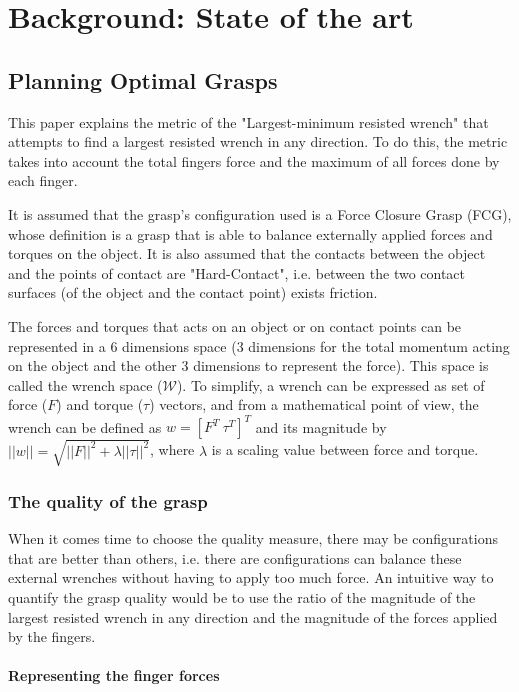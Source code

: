 
\chapter{Background: State of the art}
\label{chapter:evaluation}
\section{Planning Optimal Grasps}
\label{section:LMRW}

This paper \cite{ferrari1992planning} explains the metric of the "Largest-minimum resisted wrench" that attempts to find a largest resisted wrench in any direction. To do this, the metric takes into account the total fingers force and the maximum of all forces done by each finger.
\par
It is assumed that the grasp's configuration used is a Force Closure Grasp (FCG), whose definition is a grasp that is able to balance externally applied forces and torques on the object.
It is also assumed that the contacts between the object and the points of contact are "Hard-Contact", i.e. between the two contact surfaces (of the object and the contact point) exists friction.
\par
The forces and torques that acts on an object or on contact points can be represented in a 6 dimensions space (3 dimensions for the total momentum acting on the object and the other 3 dimensions to represent the force). This space is called the wrench space ($\mathcal{W}$). To simplify, a wrench can be expressed as set of force ($F$) and torque ($\tau$) vectors, and from a mathematical point of view, the wrench can be defined as $w = [F^T\ \tau^T]^T$ and its magnitude by $||w|| = \sqrt{||F||^2 + \lambda||\tau||^2}$, where $\lambda$ is a scaling value between force and torque.

\subsection{The quality of the grasp}
When it comes time to choose the quality measure, there may be configurations that are better than others, i.e. there are configurations can balance these external wrenches without having to apply too much force. An intuitive way to quantify the grasp quality would be to use the ratio of the magnitude of the largest resisted wrench in any direction and the magnitude of the forces applied by the fingers.

\subsubsection{Representing the finger forces}

